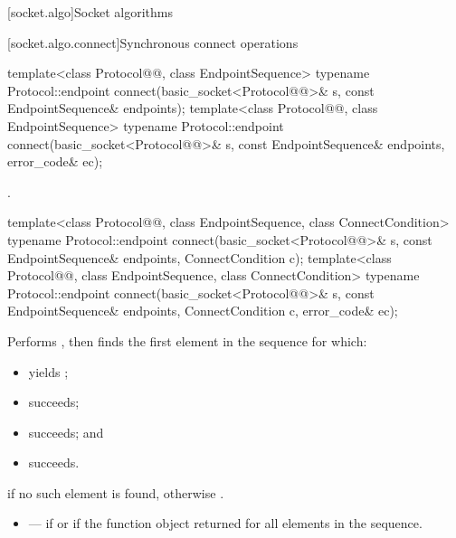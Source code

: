 
[socket.algo]{Socket algorithms}


[socket.algo.connect]{Synchronous connect operations}

\begin{itemdecl}
template<class Protocol@@, class EndpointSequence>
  typename Protocol::endpoint connect(basic_socket<Protocol@@>& s,
                                      const EndpointSequence& endpoints);
template<class Protocol@@, class EndpointSequence>
  typename Protocol::endpoint connect(basic_socket<Protocol@@>& s,
                                      const EndpointSequence& endpoints,
                                      error_code& ec);
\end{itemdecl}

\begin{itemdescr}
\pnum
\returns {}.
\end{itemdescr}

\begin{itemdecl}
template<class Protocol@@, class EndpointSequence, class ConnectCondition>
  typename Protocol::endpoint connect(basic_socket<Protocol@@>& s,
                                      const EndpointSequence& endpoints,
                                      ConnectCondition c);
template<class Protocol@@, class EndpointSequence, class ConnectCondition>
  typename Protocol::endpoint connect(basic_socket<Protocol@@>& s,
                                      const EndpointSequence& endpoints,
                                      ConnectCondition c, error_code& ec);
\end{itemdecl}

\begin{itemdescr}
\pnum
\effects Performs , then finds the first element  in the sequence  for which:
\begin{itemize}
\item
{} yields ;
\item
{} succeeds;
\item
{} succeeds; and
\item
{} succeeds.
\end{itemize}

\pnum
\returns {} if no such element is found, otherwise .

\pnum
\errors
\begin{itemize}
\item
{} --- if  or if the function object  returned  for all elements in the sequence.
\end{itemize}
\end{itemdescr}

